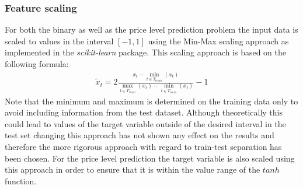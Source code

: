 \subsubsection{Feature scaling}
For both the binary as well as the price level prediction problem the input data is scaled to values in the interval $[-1,1]$ using the Min-Max scaling approach as implemented in the \textit{scikit-learn} package. This scaling approach is based on the following formula: \begin{align*}
\tilde{x}_t = 2\frac{x_t - \min_{t \in T_{train}}(x_t)}{\max_{t \in T_{train}}(x_t)-\min_{t \in T_{train}}(x_t)} - 1
\end{align*}
Note that the minimum and maximum is determined on the training data only to avoid including information from the test dataset. Although theoretically this could lead to values of the target variable outside of the desired interval in the test set changing this approach has not shown any effect on the results and therefore the more rigorous approach with regard to train-test separation has been chosen. For the price level prediction the target variable is also scaled using this approach in order to ensure that it is within the value range of the $tanh$ function.
